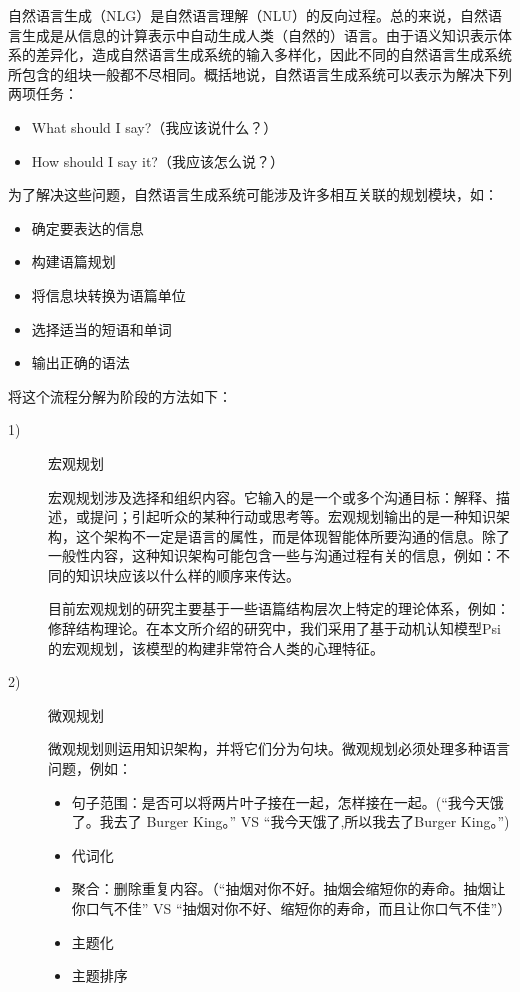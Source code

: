 \begin{enumerate}
自然语言生成（NLG）是自然语言理解（NLU）的反向过程。总的来说，自然语言生成是从信息的计算表示中自动生成人类（自然的）语言。由于语义知识表示体系的差异化，造成自然语言生成系统的输入多样化，因此不同的自然语言生成系统所包含的组块一般都不尽相同。概括地说，自然语言生成系统可以表示为解决下列两项任务：

\begin{itemize}
\item What should I say?（我应该说什么？）
\item How should I say it?（我应该怎么说？）
\end{itemize}

为了解决这些问题，自然语言生成系统可能涉及许多相互关联的规划模块，如：
\begin{itemize}
\item 确定要表达的信息
\item 构建语篇规划
\item 将信息块转换为语篇单位
\item 选择适当的短语和单词
\item 输出正确的语法
\end{itemize}

将这个流程分解为阶段的方法如下：
\begin{description}

\item [1)] 宏观规划

宏观规划涉及选择和组织内容。它输入的是一个或多个沟通目标：解释、描述，或提问；引起听众的某种行动或思考等。宏观规划输出的是一种知识架构，这个架构不一定是语言的属性，而是体现智能体所要沟通的信息。除了一般性内容，这种知识架构可能包含一些与沟通过程有关的信息，例如：不同的知识块应该以什么样的顺序来传达。

目前宏观规划的研究主要基于一些语篇结构层次上特定的理论体系，例如：修辞结构理论\cite{Mann1987}。在本文所介绍的研究中，我们采用了基于动机认知模型Psi的宏观规划，该模型的构建非常符合人类的心理特征。

\item [2)] 微观规划

微观规划则运用知识架构，并将它们分为句块。微观规划必须处理多种语言问题，例如：

\begin{itemize}
\item 句子范围：是否可以将两片叶子接在一起，怎样接在一起。(“我今天饿了。我去了 Burger King。” VS “我今天饿了,所以我去了Burger King。”)
\item 代词化
\item 聚合：删除重复内容。（“抽烟对你不好。抽烟会缩短你的寿命。抽烟让你口气不佳” VS “抽烟对你不好、缩短你的寿命，而且让你口气不佳”）
\item 主题化
\item 主题排序
\end{itemize}


\end{description}
\end{enumerate}

